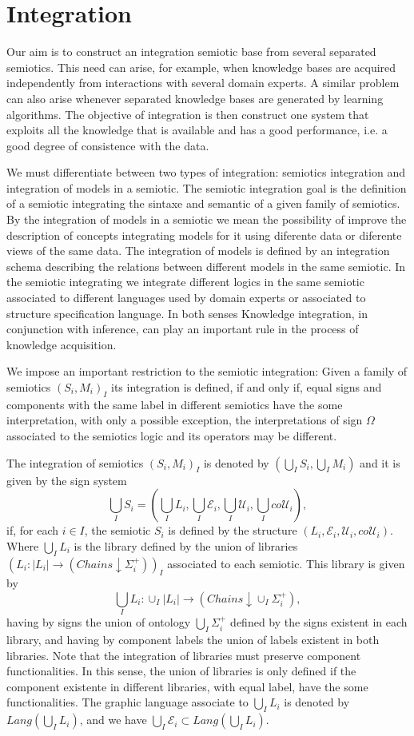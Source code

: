 \documentclass[oribibl]{llncs}
\newcommand{\E}{\mathcal{E}}
\newcommand{\U}{\mathcal{U}}
\begin{document}
\section{Integration}\label{integration}
Our aim is to construct an integration semiotic base from several separated semiotics. This need can arise, for example, when knowledge bases are acquired independently from interactions with several domain experts. A similar problem can also arise whenever separated knowledge bases are generated by learning algorithms.  The objective of integration is then construct one system that exploits all the knowledge that is available and has a good performance, i.e. a good degree of consistence with the data.

We must differentiate between two types of integration: semiotics integration and integration of models in a semiotic. The semiotic integration goal is the definition of a semiotic integrating the sintaxe and semantic of a given family of semiotics. By the integration of models in a semiotic we mean the possibility of improve the description of concepts integrating models for it using diferente data or diferente views of the same data. The integration of models is defined by an integration schema describing the relations between different models in the same semiotic. In the semiotic integrating we integrate different logics in the same semiotic associated to different languages used by domain experts or associated to structure specification language. In both senses Knowledge integration, in conjunction with inference, can play an important rule in the process of knowledge acquisition.

We impose an important restriction to the semiotic integration: Given a family of semiotics $(S_i,M_i)_I$ its integration is defined, if and only if, equal signs and components with the same label in different semiotics have the some interpretation, with only a possible exception, the interpretations of sign $\Omega$ associated to the semiotics logic and its operators may be different.

The integration of semiotics $(S_i,M_i)_I$ is denoted by $(\bigcup_IS_i,\bigcup_IM_i)$ and it is given by the sign system
\[\bigcup_IS_i=(\bigcup_IL_i,\bigcup_I\E_i,\bigcup_I\U_i,\bigcup_Ico\U_i),\]
 if, for each $i\in I$, the semiotic $S_i$ is defined by the structure $(L_i,\E_i,\U_i,co\U_i)$. Where $\bigcup_IL_i$ is the library defined by the union of libraries $(L_i:|L_i|\rightarrow (Chains\downarrow \Sigma_i^+))_I$ associated to each semiotic. This library is given by
\[\bigcup_IL_i:\cup_I|L_i|\rightarrow (Chains\downarrow \cup_I\Sigma_i^+),
\] having by signs the union of ontology $\bigcup_I\Sigma_i^+$ defined by the signs existent in each library, and having by component labels the union of labels existent in both libraries. Note that the integration of libraries must preserve component functionalities. In this sense, the union of libraries is only defined if the component existente in different libraries, with equal label, have the some functionalities. The graphic language associate to $\bigcup_IL_i$ is denoted by $Lang(\bigcup_IL_i)$, and we have $\bigcup_I\E_i\subset Lang(\bigcup_IL_i)$.
\end{document}
